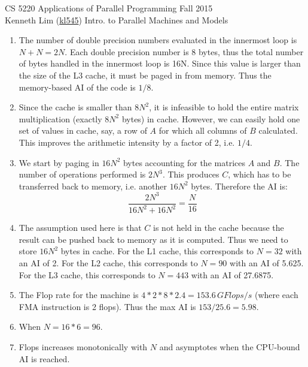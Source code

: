 \documentclass{scrartcl}
\begin{document}
  \begin{framed}
  \large
  CS 5220 Applications of Parallel Programming \hfill Fall 2015 \\
  Kenneth Lim (\href{mailto:kl545@cornell.edu}{kl545}) \hfill Intro. to Parallel Machines and Models \hspace{-3ex}
  \end{framed}
  \begin{enumerate}
    \item The number of double precision numbers evaluated in the innermost loop is $N + N = 2N$. Each double precision number is 8 bytes, thus the total number of bytes handled in the innermost loop is 16N. Since this value is larger than the size of the L3 cache, it must be paged in from memory. Thus the memory-based AI of the code is $1/8$.
    \item Since the cache is smaller than $8N^2$, it is infeasible to hold the entire matrix multiplication (exactly $8N^2$ bytes) in cache. However, we can easily hold one set of values in cache, say, a row of $A$ for which all columns of $B$ calculated. This improves the arithmetic intensity by a factor of 2, i.e. $1/4$.
    \item We start by paging in $16N^2$ bytes accounting for the matrices $A$ and $B$. The number of operations performed is $2N^3$. This produces $C$, which has to be transferred back to memory, i.e. another $16N^2$ bytes. Therefore the AI is:
    \[
      \frac{2N^3}{16N^2 + 16N^2} = \frac{N}{16}
    \]
    \item The assumption used here is that $C$ is not held in the cache because the result can be pushed back to memory as it is computed. Thus we need to store $16N^2$ bytes in cache. For the L1 cache, this corresponds to $N = 32$ with an AI of 2. For the L2 cache, this corresponds to $N = 90$ with an AI of 5.625. For the L3 cache, this corresponds to $N = 443$ with an AI of 27.6875.
    \item The Flop rate for the machine is $4*2*8*2.4 = 153.6\,\si{GFlops/s}$ (where each FMA instruction is 2 flops). Thus the max AI is $153/25.6 = 5.98$.
    \item When $N = 16*6 = 96$.
    \item Flops increases monotonically with $N$ and asymptotes when the CPU-bound AI is reached.
  \end{enumerate}
\end{document}
